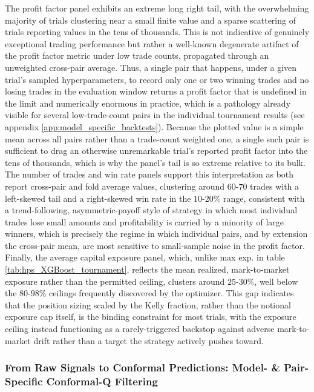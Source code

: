 \documentclass[12pt, a4paper]{article}
\begin{document}
The profit factor panel exhibits an extreme long right tail, with the overwhelming majority of trials clustering near a small finite value and a sparse scattering of trials 
reporting values in the tens of thousands. This is not indicative of genuinely exceptional trading performance but rather a well-known degenerate artifact of the profit factor 
metric under low trade counts, propagated through an unweighted cross-pair average. Thus, a single pair that happens, under a given trial's sampled hyperparameters, to record only 
one or two winning trades and no losing trades in the evaluation window returns a profit factor that is undefined in the limit and numerically enormous in practice, which is a pathology 
already visible for several low-trade-count pairs in the individual tournament results (see appendix \ref{app:model_specific_backtests}). Because the plotted value is a 
simple mean across all pairs rather than a trade-count weighted one, a single such pair is sufficient to drag an otherwise unremarkable trial's reported profit factor into the tens 
of thousands, which is why the panel's tail is so extreme relative to its bulk. The number of trades and win rate panels support this interpretation as both report cross-pair and fold 
average values, clustering around $60$-$70$ trades with a left-skewed tail and a right-skewed win rate in the $10$-$20\%$ range, consistent with a trend-following, 
asymmetric-payoff style of strategy in which most individual trades lose small amounts and profitability is carried by a minority of large winners, which is precisely the regime 
in which individual pairs, and by extension the cross-pair mean, are most sensitive to small-sample noise in the profit factor. 
Finally, the average capital exposure panel, which, unlike max exp. in table \ref{tab:hps_XGBoost_tournament}, reflects the mean realized, mark-to-market exposure rather than the 
permitted ceiling, clusters around $25$-$30\%$, well below the $80$-$98\%$ ceilings frequently discovered by the optimizer. This gap indicates that the position sizing scaled by 
the Kelly fraction, rather than the notional exposure cap itself, is the binding constraint for most trials, with the exposure ceiling instead functioning as a rarely-triggered 
backstop against adverse mark-to-market drift rather than a target the strategy actively pushes toward.


\subsubsection{From Raw Signals to Conformal Predictions: Model- \& Pair-Specific Conformal-Q Filtering}\label{sec:conformal_preds_and_qfilter}
\end{document}
